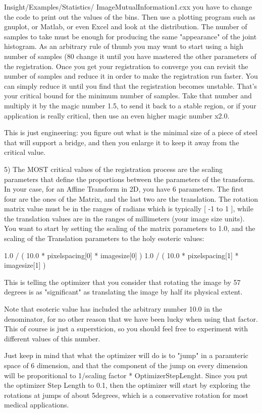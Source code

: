 Insight/Examples/Statistics/
ImageMutualInformation1.cxx
you have to change the code to print out the values
of the bins. Then use a plotting program such as gnuplot,
or Matlab, or even Excel and look at the distribution.
The number of samples to take must be enough
for producing the same "appearance" of the joint histogram.
As an arbitrary rule of thumb you may want to start using
a high number of samples (80%
change it until you have mastered the other parameters
of the registration.  Once you get your registration to converge
you can revisit the number of samples and reduce it in order
to make the registration run faster. You can simply reduce it
until you find that the registration becomes unstable. That's
your critical bound for the minimum number of samples.
Take that number and multiply it by the magic number 1.5,
to send it back to a stable region, or if your application is
really critical, then use an even higher magic number x2.0.

This is just engineering: you figure out what is the minimal
size of a piece of steel that will support a bridge, and then
you enlarge it to keep it away from the critical value.

5)  The MOST critical values of the registration process are the
scaling parameters that define the proportions between
the parameters of the transform. In your case, for an Affine
Transform in 2D, you have 6 parameters. The first four are
the ones of the Matrix, and the last two are the translation.
The rotation matrix value must be in the ranges of radians
which is typically [ -1 to 1 ], while the translation values are
in the ranges of millimeters (your image size units).
You want to start by setting the scaling of the matrix
parameters to 1.0, and the scaling of the Translation
parameters to the holy esoteric values:

1.0   /  (  10.0 * pixelspacing[0]  *  imagesize[0]  )
1.0   /  (  10.0 * pixelspacing[1]  *  imagesize[1]  )

This is telling the optimizer that you consider that rotating
the image by 57 degrees is as "significant" as translating
the image by half its physical extent.

Note that esoteric value has included the arbitrary number
10.0 in the denominator, for no other reason that we have
been lucky when using that factor. This of course is just a
supersticion, so you should feel free to experiment with
different values of this number.

Just keep in mind that what the optimizer will do is to
"jump" in a paramteric space of 6 dimension, and that the
component of the jump on every dimension will be proporitional
to 1/scaling factor * OptimizerStepLenght.     Since you put
the optimizer Step Length to 0.1, then the optimizer will start
by exploring the rotations at jumps of about 5degrees, which
is a conservative rotation for most medical applications.

